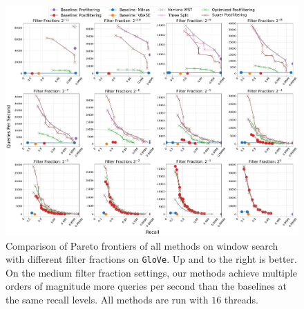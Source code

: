 \documentclass{article}
\theoremstyle{plain}
\theoremstyle{definition}
\theoremstyle{remark}
\newcommand{\datasetname}[1]{\texttt{#1}}
\begin{document}
\begin{figure}[t]
\begin{center}
\centerline{\includegraphics[width=16cm]{images/glove-100-angular_results_vamana.pdf}}
\caption{Comparison of Pareto frontiers of all methods on window search with different filter fractions on \datasetname{GloVe}. Up and to the right is better. On the medium filter fraction settings, our methods achieve multiple orders of magnitude more
queries per second than the baselines at the same recall levels. All methods are run with $16$ threads.}
\label{fig:glove_results}
\end{center}
\end{figure}
\end{document}
